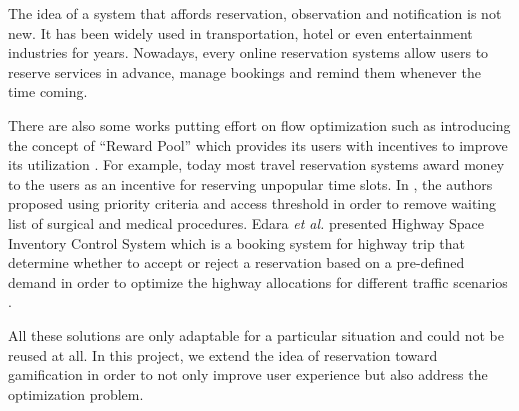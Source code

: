 The idea of a system that affords reservation, observation and notification is not new. It has been widely used in transportation, hotel or even entertainment industries for years. Nowadays, every online reservation systems allow users to reserve services in advance, manage bookings and remind them whenever the time coming. 

There are also some works putting effort on flow optimization such as introducing the concept of ``Reward Pool'' which provides its users with incentives to improve its utilization \cite{winand2006methods}. For example, today most travel reservation systems  award money to the users as an incentive for reserving unpopular time slots. In \cite{gauld2000solving}, the authors proposed using priority criteria and access threshold in order to remove waiting list of surgical and medical procedures. Edara \emph{et al.} presented Highway Space Inventory Control System which is a booking system for highway trip that determine whether to accept or reject a reservation based on a pre-defined demand in order to optimize the highway allocations for different traffic scenarios \cite{edara2008model}. 

All these solutions are only adaptable for a particular situation and could not be reused at all. In this project, we extend the idea of reservation toward gamification in order to not only improve user experience but also address the optimization problem.